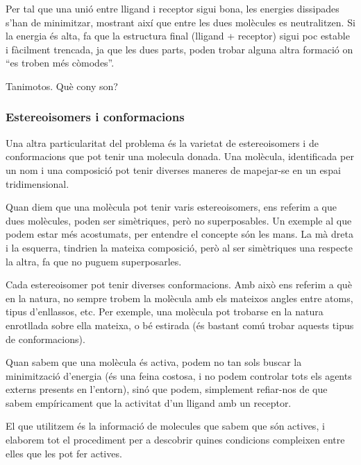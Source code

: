 \documentclass[titlepage,a4paper,12pt]{book}
\begin{document}
Per tal que una unió entre lligand i receptor sigui bona, les energies
dissipades s'han de minimitzar, mostrant així que entre les dues molècules es
neutralitzen.  Si la energia és alta, fa que la estructura final (lligand +
receptor) sigui poc estable i fàcilment trencada, ja que les dues parts, poden
trobar alguna altra formació on ``es troben més còmodes''.

Tanimotos. Què cony son? %

\subsubsection{Estereoisomers i conformacions}\label{ssub:estereoisomers i conformacions}

Una altra particularitat del problema és la varietat de estereoisomers i de
conformacions que pot tenir una molecula donada.  Una molècula, identificada per
un nom i una composició pot tenir diverses maneres de mapejar-se en un espai
tridimensional.

Quan diem que una molècula pot tenir varis estereoisomers, ens referim a que
dues molècules, poden ser simètriques, però no superposables.  Un exemple al que
podem estar més acostumats, per entendre el concepte són les mans.  La mà dreta
i la esquerra, tindrien la mateixa composició, però al ser simètriques una
respecte la altra, fa que no puguem superposarles.

Cada estereoisomer pot tenir diverses conformacions.  Amb això ens referim a què
en la natura, no sempre trobem la molècula amb els mateixos angles entre atoms,
tipus d'enllassos, etc. Per exemple, una molècula pot trobarse en la natura
enrotllada sobre ella mateixa, o bé estirada (és bastant comú trobar aquests
tipus de conformacions).


Quan sabem que una molècula és activa, podem no tan sols buscar la minimització
d'energia (és una feina costosa, i no podem controlar tots els agents externs
presents en l'entorn), sinó que podem, simplement refiar-nos de que sabem
empíricament que la activitat d'un lligand amb un receptor.



El que utilitzem és la informació de molecules que sabem que són actives,
i elaborem tot el procediment per a descobrir quines condicions compleixen entre
elles que les pot fer actives.
\end{document}
